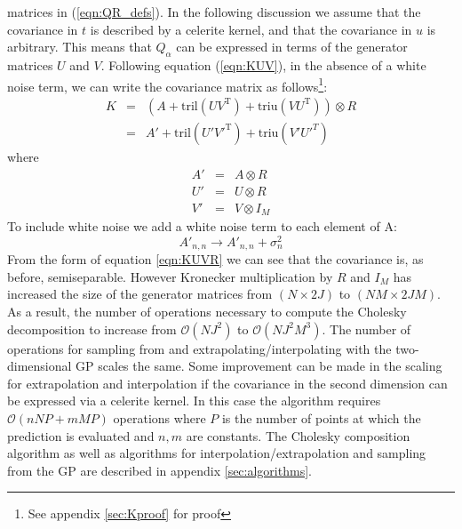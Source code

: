 \documentclass[preprint2]{aastex62}
\newcommand{\project}[1]{\textsf{#1}}
\newcommand{\celerite}{\project{celerite }}
\newcommand{\T}{\ensuremath{\mathrm{T}}}
\begin{document}
	matrices in (\ref{eqn:QR_defs}). In the following discussion we assume that the covariance in $t$ is described by a \celerite kernel, and that 
	the covariance in $u$ is arbitrary. This means that $Q_\alpha$ can be expressed in terms of the generator matrices $U$ and $V$.  Following equation 
	(\ref{eqn:KUV}), in the absence of a white noise term, we can write the covariance matrix as follows\footnote{See appendix \ref{sec:Kproof} for proof}:
	\begin{eqnarray}
	\label{eqn:KUVR}
		\nonumber K &=& \left(A + \mathrm{tril}(UV^\T) + \mathrm{triu}(VU^\T)\right)\otimes R \\
		&=& A' + \mathrm{tril}(U'V'^\T) + \mathrm{triu}(V'U'^T)
	\end{eqnarray}
	where
	\begin{eqnarray}
		A' &=& A\otimes R \\
		U' &=& U\otimes R \\
		V' &=& V\otimes I_M
	\end{eqnarray}
	To include white noise we add a white noise term to each element of A:
	\begin{equation}
		A'_{n, n} \to A'_{n, n} + \sigma_n^2
	\end{equation}
	From the form of equation \ref{eqn:KUVR} we can see that the covariance is, as before, semiseparable. However Kronecker 
	multiplication by $R$ and $I_M$ has increased the size of the generator matrices from $(N\times 2J)$ to $(NM\times 2JM)$. As a result,  
	the number of operations necessary to compute the Cholesky decomposition to increase from $\mathcal{O}(NJ^2)$ to $\mathcal{O}(NJ^2M^3)$. 
	The number of operations for sampling from and extrapolating/interpolating with the two-dimensional GP scales the same. Some improvement 
	can be made in the scaling for extrapolation and interpolation if the covariance in the second dimension can be expressed via 
	a \celerite kernel. In this case the algorithm requires $\mathcal{O}(nNP + mMP)$ operations where $P$ is the number of points at which the prediction is evaluated and $n, m$ are constants. The 
	Cholesky composition algorithm as well as algorithms for interpolation/extrapolation and sampling from the GP are described in appendix 
	\ref{sec:algorithms}. 
	
\end{document}
